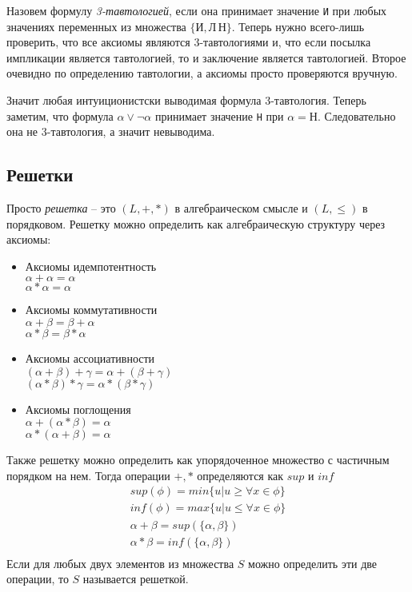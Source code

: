 Назовем формулу \emph{3-тавтологией}, если она принимает значение
\texttt{И} при любых значениях переменных из множества $\{\texttt{И}, \texttt{Л}\, \texttt{Н}\}$. Теперь нужно всего-лишь проверить, что все аксиомы являются 3-тавтологиями и, что если посылка импликации является тавтологией, то и заключение является тавтологией. Второе очевидно по определению тавтологии, а аксиомы просто проверяются вручную.

Значит любая интуиционистски выводимая формула 3-тавтология. Теперь заметим, что формула $\alpha \vee \neg \alpha$ принимает значение \texttt{Н} при $\alpha = \texttt{Н}$. Следовательно она не 3-тавтология, а значит невыводима.
\subsection{Решетки}
\label{sec-5-3}
Просто \emph{решетка} -- это $(L, +, *)$ в алгебраическом смысле и $(L, \leq)$ в порядковом. Решетку можно определить как алгебраическую структуру через аксиомы: 
\begin{itemize}
\item Аксиомы идемпотентность\\
$\alpha + \alpha = \alpha$\\
$\alpha * \alpha = \alpha$
\item Аксиомы коммутативности\\
$\alpha + \beta = \beta + \alpha$\\
$\alpha * \beta = \beta * \alpha$
\item Аксиомы ассоциативности\\
$(\alpha + \beta) + \gamma = \alpha + (\beta + \gamma)$\\
$(\alpha * \beta) * \gamma = \alpha * (\beta * \gamma)$
\item Аксиомы поглощения\\
$\alpha + (\alpha * \beta) = \alpha$\\
$\alpha * (\alpha + \beta) = \alpha$
\end{itemize} 
Также решетку можно определить как упорядоченное множество с частичным порядком на нем. Тогда операции $+, *$ определяются как $sup$ и $inf$\\
\begin{gather*}
sup(\phi) = min \lbrace u \vert u \geq \forall x \in \phi \rbrace\\ inf(\phi) = max \lbrace u \vert u \leq \forall x \in \phi \rbrace\\
\alpha + \beta = sup (\lbrace \alpha, \beta \rbrace)\\
\alpha * \beta = inf (\lbrace \alpha, \beta \rbrace)\\
\end{gather*}
Если для любых двух элементов из множества $S$ можно определить эти две операции, то $S$ называется решеткой.

